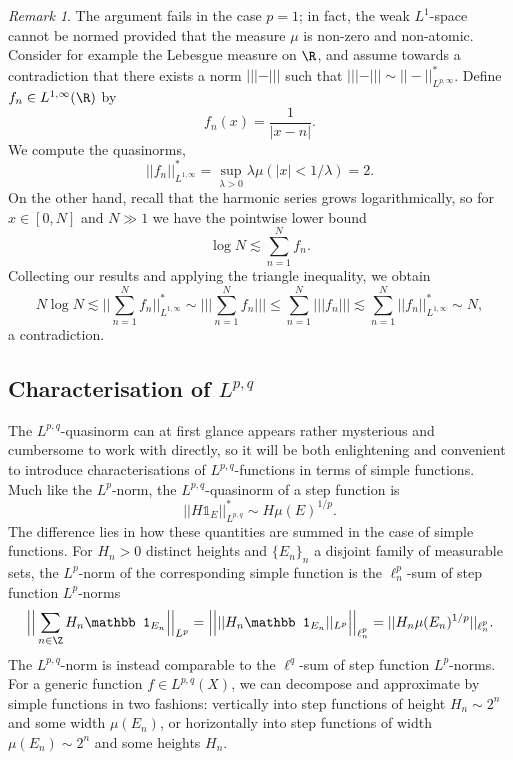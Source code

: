 \documentclass[reqno]{amsart}
\theoremstyle{definition}
\theoremstyle{remark}
\newtheorem*{remark}{Remark}
\begin{document}
\begin{remark}
	The argument fails in the case $p = 1$; in fact, the weak $L^1$-space cannot be normed provided that the measure $\mu$ is non-zero and non-atomic. Consider for example the Lebesgue measure on $\R$, and assume towards a contradiction that there exists a norm $||| - |||$ such that $|||- ||| \sim ||-||_{L^{p, \infty}}^*$. Define $f_n \in L^{1, \infty} (\R)$ by 
		\begin{equation}
			 f_n (x) = \frac{1}{|x - n|}. \tag{*} \label{eq:notnorm}
		\end{equation} 
	We compute the quasinorms, 
		\[ || f_n||_{L^{1, \infty}}^* = \sup_{\lambda > 0} \lambda \mu(|x| < 1/\lambda) = 2. \]
	On the other hand, recall that the harmonic series grows logarithmically, so for $x \in [0, N]$ and $N \gg 1$ we have the pointwise lower bound 
		\[ \log N \lesssim \sum_{n = 1}^N f_n. \]	
	Collecting our results and applying the triangle inequality, we obtain
		\[ N \log N \lesssim \Big|\Big| \sum_{n = 1}^N f_n \Big|\Big|_{L^{1, \infty}}^* \sim \Big|\Big|\Big| \sum_{n = 1}^N f_n \Big|\Big|\Big| \leq \sum_{n = 1}^N |||f_n||| \lesssim \sum_{n = 1}^N ||f_n||_{L^{1, \infty}}^* \sim N, \]
	a contradiction.			
\end{remark}

\subsection{Characterisation of $L^{p, q}$}

The $L^{p, q}$-quasinorm can at first glance appears rather mysterious and cumbersome to work with directly, so it will be both enlightening and convenient to introduce characterisations of $L^{p, q}$-functions in terms of simple functions. Much like the $L^p$-norm, the $L^{p, q}$-quasinorm of a step function is
	\[ || H \mathbb 1_E ||_{L^{p, q}}^* \sim H \mu (E)^{1/p}. \]
The difference lies in how these quantities are summed in the case of simple functions. For $H_n > 0$ distinct heights and $\{E_n\}_n$ a disjoint family of measurable sets, the $L^p$-norm of the corresponding simple function is the $\ell^p_n$-sum of step function $L^p$-norms
	\[ \Big|\Big| \sum_{n \in \Z} H_n \mathbb 1_{E_n} \Big|\Big|_{L^p} = \Big|\Big| || H_n \mathbb 1_{E_n} ||_{L^p} \Big|\Big|_{\ell^p_n} = ||H_n \mu(E_n)^{1/p}||_{\ell^p_n}. \]
The $L^{p, q}$-norm is instead comparable to the $\ell^q$-sum of step function $L^p$-norms. For a generic function $f \in L^{p, q} (X)$, we can decompose and approximate by simple functions in two fashions: vertically into step functions of height $H_n \sim 2^n$ and some width $\mu(E_n)$, or horizontally into step functions of width $\mu(E_n) \sim 2^n$ and some heights $H_n$. 
\end{document}
